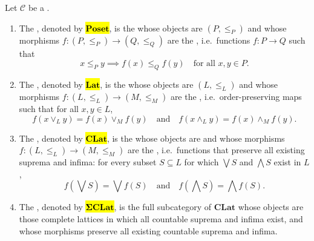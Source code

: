 \begin{definition} \label{definition:category_of_posets_and_lattices}
    Let $\mathcal{C}$ be a .
    \begin{enumerate}
        \item The , denoted by \hl{$\mathbf{Poset}$}, is the   whose objects are  $(P, \leq_P)$ and whose morphisms $f : (P, \leq_P) \to (Q, \leq_Q)$ are the , i.e.\ functions $f : P \to Q$ such that
        $$x \leq_P y \implies f(x) \leq_Q f(y) \quad \text{for all } x, y \in P.$$

        \item The , denoted by \hl{$\mathbf{Lat}$}, is the   whose objects are  $(L, \leq_L)$ and whose morphisms $f : (L, \leq_L) \to (M, \leq_M)$ are the , i.e.\ order-preserving maps such that for all $x, y \in L$,
        $$f(x \vee_L y) = f(x) \vee_M f(y) \quad \text{and} \quad f(x \wedge_L y) = f(x) \wedge_M f(y).$$

        \item The , denoted by \hl{$\mathbf{CLat}$}, is the   whose objects are  and whose morphisms $f : (L, \leq_L) \to (M, \leq_M)$ are the , i.e.\ functions that preserve all existing suprema and infima: for every subset $S \subseteq L$ for which $\bigvee S$ and $\bigwedge S$ exist in $L$,
        $$f\left(\bigvee S\right) = \bigvee f(S) \quad \text{and} \quad f\left(\bigwedge S\right) = \bigwedge f(S).$$

        \item The , denoted by \hl{$\mathbf{\Sigma CLat}$}, is the full subcategory of $\mathbf{CLat}$ whose objects are those complete lattices in which all countable suprema and infima exist, and whose morphisms preserve all existing countable suprema and infima.
    \end{enumerate}
\end{definition}
